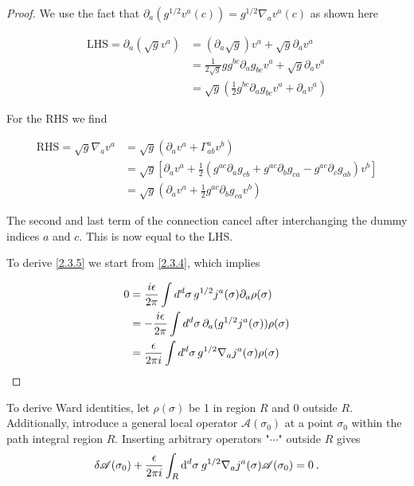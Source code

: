 \begin{tcolorbox}[breakable]
	\begin{proof}
		We use the fact that \( \partial_a (g^{1/2} v^a(c)) = g^{1/2} \nabla_a v^a(c) \) as shown here
		
		\[
		\begin{aligned}
			\text{LHS} = \partial_a (\sqrt{g} v^a) &= (\partial_a \sqrt{g}) v^a + \sqrt{g} \partial_a v^a \\
			&= \frac{1}{2\sqrt{g}} g g^{bc} \partial_a g_{bc} v^a + \sqrt{g} \partial_a v^a \\
			&= \sqrt{g} \left( \frac{1}{2} g^{bc} \partial_a g_{bc} v^a + \partial_a v^a \right)
		\end{aligned}
		\]
		
		For the RHS we find
		
		\[
		\begin{aligned}
			\text{RHS} = \sqrt{g} \nabla_a v^a &= \sqrt{g} \left( \partial_a v^a + \Gamma^a_{ab} v^b \right) \\
			&= \sqrt{g} \left[ \partial_a v^a + \frac{1}{2} (g^{ac} \partial_a g_{cb} + g^{ac} \partial_b g_{ca} - g^{ac} \partial_c g_{ab}) v^b \right] \\
			&= \sqrt{g} \left( \partial_a v^a + \frac{1}{2} g^{ac} \partial_b g_{ca} v^b \right)
		\end{aligned}
		\]
		
		The second and last term of the connection cancel after interchanging the dummy indices \( a \) and \( c \). This is now equal to the LHS.
		
		To derive \eqref{2.3.5} we start from \eqref{2.3.4}, which implies
		
		\[
		\begin{aligned}
			0 &= \frac{i \epsilon}{2 \pi}\int d^d \sigma \, g^{1/2} j^a(\sigma) \partial_a \rho(\sigma) \\
			&= -\frac{i \epsilon}{2 \pi}\int d^d \sigma \, \partial_a (g^{1/2} j^a(\sigma)) \rho(\sigma) \\
			&= \frac{\epsilon}{2 \pi i}\int d^d \sigma \, g^{1/2} \nabla_a j^a(\sigma) \rho(\sigma)
		\end{aligned}
		\] 
	\end{proof}    
\end{tcolorbox}

To derive Ward identities, let $\rho(\sigma)$ be 1 in region $R$ and 0 outside $R$. Additionally, introduce a general local operator $\mathscr{A}(\sigma_{0})$ at a point $\sigma_{0}$ within the path integral region $R$.    
Inserting arbitrary operators "$\cdots$" outside $R$ gives    
\begin{equation} \label{2.3.7}
	\delta \mathscr{A}(\sigma_{0})+\frac{\epsilon}{2 \pi i} \int_{R} \mathrm{d}^{d} \sigma \: g^{1 / 2} \nabla_{a} j^{a}(\sigma) \mathscr{A}(\sigma_{0})=0 \:.
\end{equation}

